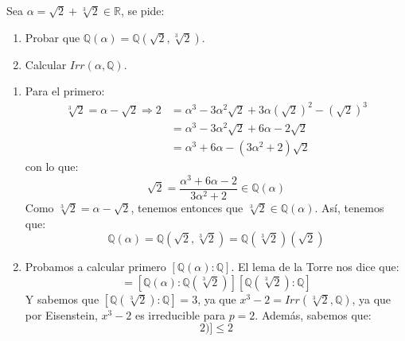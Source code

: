 \begin{ejercicio}
    Sea $\alpha = \sqrt{2}+\sqrt[3]{2}\in \mathbb{R}$, se pide:
    \begin{enumerate}[label=\alph*)]
        \item Probar que $\mathbb{Q}(\alpha) = \mathbb{Q}(\sqrt{2},\sqrt[3]{2})$.
        \item Calcular $Irr(\alpha,\mathbb{Q})$.
    \end{enumerate}
    \begin{enumerate}[label=\alph*)]
        \item Para el primero:
            \begin{align*}
                \sqrt[3]{2} = \alpha - \sqrt{2} \Longrightarrow 2&=\alpha^3 - 3\alpha^2\sqrt{2} + 3\alpha{(\sqrt{2})}^{2} - {(\sqrt{2})}^{3} \\
                                                &=\alpha^3 - 3\alpha^2\sqrt{2}+6\alpha - 2\sqrt{2} \\
                                                &=\alpha^3 + 6\alpha-(3\alpha^2 +2)\sqrt{2}
            \end{align*}
            con lo que:
            \begin{equation*}
                \sqrt{2} = \dfrac{\alpha^3 + 6\alpha - 2}{3\alpha^2 + 2}\in \mathbb{Q}(\alpha)
            \end{equation*}
            Como $\sqrt[3]{2} = \alpha-\sqrt{2}$, tenemos entonces que $\sqrt[3]{2}\in \mathbb{Q}(\alpha)$. Así, tenemos que:
            \begin{equation*}
                \mathbb{Q}(\alpha) = \mathbb{Q}(\sqrt{2},\sqrt[3]{2}) = \mathbb{Q}(\sqrt[3]{2})(\sqrt{2})
            \end{equation*}
        \item Probamos a calcular primero $[\mathbb{Q}(\alpha):\mathbb{Q}]$. El lema de la Torre nos dice que:
            \begin{equation*}
                [\mathbb{Q}(\alpha):\mathbb{Q}] = [\mathbb{Q}(\alpha):\mathbb{Q}(\sqrt[3]{2})][\mathbb{Q}(\sqrt[3]{2}):\mathbb{Q}]
            \end{equation*}
            Y sabemos que $[\mathbb{Q}(\sqrt[3]{2}):\mathbb{Q}] =3$, ya que $x^3-2=Irr(\sqrt[3]{2},\mathbb{Q})$, ya que por Eisenstein, $x^3-2$ es irreducible para $p=2$. Además, sabemos que:
            \begin{equation*}
                [\mathbb{Q}(\alpha):\mathbb{Q}(\sqrt[3]{2})] \leq 2
            \end{equation*}

\end{enumerate}
\end{ejercicio}

